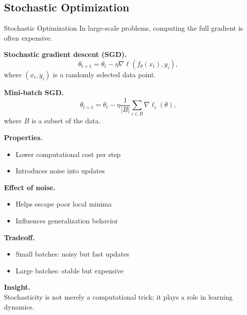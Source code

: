 \documentclass[aspectratio=169,11pt]{beamer}
\begin{document}
\subsection{Stochastic Optimization}
\begin{frame}[t,allowframebreaks]{Stochastic Optimization}
\small
In large-scale problems, computing the full gradient is often expensive.

\textbf{Stochastic gradient descent (SGD).}\\ \[
\theta_{t+1} = \theta_t - \eta \nabla \ell(f_\theta(x_i), y_i),
\]
where $(x_i, y_i)$ is a randomly selected data point.

\textbf{Mini-batch SGD.}\\ \[
\theta_{t+1} = \theta_t - \eta \frac{1}{|B|} \sum_{i \in B} \nabla \ell_i(\theta),
\]
where $B$ is a subset of the data.

\textbf{Properties.}\\ \begin{itemize}
    \item Lower computational cost per step
    \item Introduces noise into updates
\end{itemize}

\textbf{Effect of noise.}\\ \begin{itemize}
    \item Helps escape poor local minima
    \item Influences generalization behavior
\end{itemize}

\textbf{Tradeoff.}\\ \begin{itemize}
    \item Small batches: noisy but fast updates
    \item Large batches: stable but expensive
\end{itemize}

\textbf{Insight.}\\ Stochasticity is not merely a computational trick; it plays a role in learning dynamics.
\end{frame}
\end{document}
